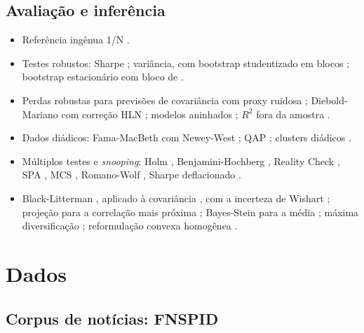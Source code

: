 \documentclass[11pt,a4paper]{article}
\begin{document}
\subsection{Avaliação e inferência}

\begin{itemize}
  \item Referência ingênua 1/N \citep{demiguel2009}.
  \item Testes robustos: Sharpe \citep{ledoit2008}; variância, com bootstrap studentizado em blocos
        \citep{ledoit2011}; bootstrap estacionário \citep{politis1994} com bloco de
        \citet{politis2004}.
  \item Perdas robustas para previsões de covariância com proxy ruidosa \citep{patton2011};
        Diebold-Mariano \citep{diebold1995} com correção HLN \citep{harvey1997}; modelos aninhados
        \citep{clark2007}; $R^2$ fora da amostra \citep{campbell2008}.
  \item Dados diádicos: Fama-MacBeth \citep{fama1973} com Newey-West \citep{newey1987}; QAP
        \citep{krackhardt1988}; clusters diádicos \citep{aronow2015,cameron2011}.
  \item Múltiplos testes e \emph{snooping}: Holm \citep{holm1979}, Benjamini-Hochberg
        \citep{benjamini1995}, Reality Check \citep{white2000}, SPA \citep{hansen2005}, MCS
        \citep{hansen2011}, Romano-Wolf \citep{romano2005}, Sharpe deflacionado \citep{bailey2014}.
  \item Black-Litterman \citep{black1992,he1999}, aplicado à covariância \citep{qian2001}, com a
        incerteza de Wishart \citep{anderson2003}; projeção para a correlação mais próxima
        \citep{higham2002}; Bayes-Stein para a média \citep{jorion1986}; máxima diversificação
        \citep{choueifaty2008}; reformulação convexa homogênea \citep{cornuejols2007}.
\end{itemize}

\section{Dados}\label{sec:dados}

\subsection{Corpus de notícias: FNSPID}
\end{document}
